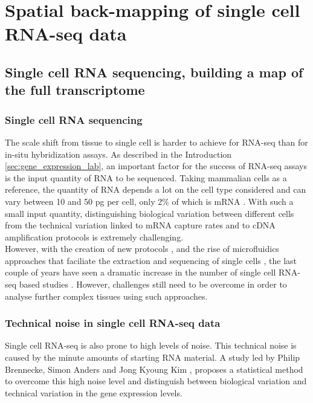 \chapter{Spatial back-mapping of single cell RNA-seq data}\label{ch:mapping}

\section{Single cell RNA sequencing, building a map of the full transcriptome}\label{sec:single_cell_rnaseq}
  \subsection{Single cell RNA sequencing}
	The scale shift from tissue to single cell is harder to achieve for RNA-seq than for in-situ hybridization assays. As described in the Introduction \ref{sec:gene_expression_lab}, an important factor for the success of RNA-seq assays is the input quantity of RNA to be sequenced. Taking mammalian cells as a reference, the quantity of RNA depends a lot on the cell type considered and can vary between 10 and 50 pg per cell, only 2\% of which is mRNA \citep{iscove02,islam11}. With such a small input quantity, distinguishing biological variation between different cells from the technical variation linked to mRNA capture rates and to cDNA amplification protocols is extremely challenging.\\

	However, with the creation of new protocols \citep{ramskold12,tang09}, and the rise of microfluidics approaches that faciliate the extraction and sequencing of single cells \citep{ozsolak10}, the last couple of years have seen a dramatic increase in the number of single cell RNA-seq based studies \citep{islam13,marinov13,yan13,staahlberg13,deng14}. However, challenges still need to be overcome in order to analyse further complex tissues using such approaches.
	
  \subsection{Technical noise in single cell RNA-seq data}
  Single cell RNA-seq is also prone to high levels of noise. This technical noise is caused by the minute amounts of starting RNA material. A study led by Philip Brennecke, Simon Anders and Jong Kyoung Kim \citep{brennecke13}, proposes a statistical method to overcome this high noise level and distinguish between biological variation and technical variation in the gene expression levels.\\
  

